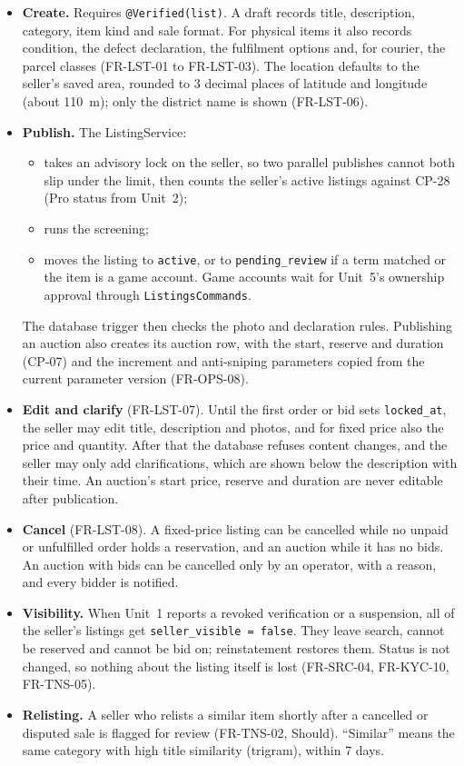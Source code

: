 \documentclass[11pt,a4paper]{article}
\begin{document}
\begin{itemize}[nosep]
  \item \textbf{Create.} Requires \texttt{@Verified(list)}. A draft records title, description, category, item kind and sale format. For physical items it also records condition, the defect declaration, the fulfilment options and, for courier, the parcel classes (FR-LST-01 to FR-LST-03). The location defaults to the seller's saved area, rounded to 3 decimal places of latitude and longitude (about 110~m); only the district name is shown (FR-LST-06).
  \item \textbf{Publish.} The ListingService:
  \begin{itemize}[nosep]
    \item takes an advisory lock on the seller, so two parallel publishes cannot both slip under the limit, then counts the seller's active listings against CP-28 (Pro status from Unit~2);
    \item runs the screening;
    \item moves the listing to \texttt{active}, or to \texttt{pending\_review} if a term matched or the item is a game account. Game accounts wait for Unit~5's ownership approval through \texttt{ListingsCommands}.
  \end{itemize}
  The database trigger then checks the photo and declaration rules. Publishing an auction also creates its auction row, with the start, reserve and duration (CP-07) and the increment and anti-sniping parameters copied from the current parameter version (FR-OPS-08).
  \item \textbf{Edit and clarify} (FR-LST-07). Until the first order or bid sets \texttt{locked\_at}, the seller may edit title, description and photos, and for fixed price also the price and quantity. After that the database refuses content changes, and the seller may only add clarifications, which are shown below the description with their time. An auction's start price, reserve and duration are never editable after publication.
  \item \textbf{Cancel} (FR-LST-08). A fixed-price listing can be cancelled while no unpaid or unfulfilled order holds a reservation, and an auction while it has no bids. An auction with bids can be cancelled only by an operator, with a reason, and every bidder is notified.
  \item \textbf{Visibility.} When Unit~1 reports a revoked verification or a suspension, all of the seller's listings get \texttt{seller\_visible = false}. They leave search, cannot be reserved and cannot be bid on; reinstatement restores them. Status is not changed, so nothing about the listing itself is lost (FR-SRC-04, FR-KYC-10, FR-TNS-05).
  \item \textbf{Relisting.} A seller who relists a similar item shortly after a cancelled or disputed sale is flagged for review (FR-TNS-02, Should). ``Similar'' means the same category with high title similarity (trigram), within 7 days.
\end{itemize}
\end{document}
